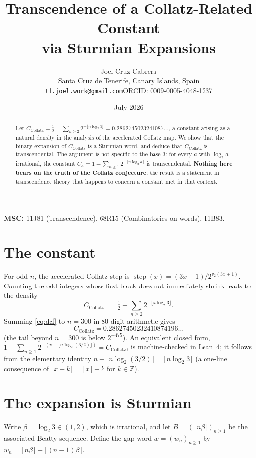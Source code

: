 \documentclass[11pt,a4paper]{article}
\title{\bfseries Transcendence of a Collatz-Related Constant\\ via Sturmian Expansions}
\author{Joel Cruz Cabrera\\
\small Santa Cruz de Tenerife, Canary Islands, Spain\\
\small\texttt{tf.joel.work@gmail.com}\quad ORCID: 0009-0005-4048-1237}
\date{July 2026}
\theoremstyle{plain}
\theoremstyle{definition}
\newcommand{\CC}{C_{\mathrm{Collatz}}}
\begin{document}
\maketitle

\begin{abstract}
Let $\CC=\tfrac12-\sum_{n\ge2}2^{-\lfloor n\log_2 3\rfloor}=0.2862745023241087\ldots$, a
constant arising as a natural density in the analysis of the accelerated Collatz map. We show
that the binary expansion of $\CC$ is a Sturmian word, and deduce that $\CC$ is
transcendental. The argument is not specific to the base $3$: for every $a$ with $\log_2 a$
irrational, the constant $C_a=1-\sum_{n\ge1}2^{-\lfloor n\log_2 a\rfloor}$ is transcendental.
\textbf{Nothing here bears on the truth of the Collatz conjecture}; the result is a statement
in transcendence theory that happens to concern a constant met in that context.
\end{abstract}

\noindent\textbf{MSC:} 11J81 (Transcendence), 68R15 (Combinatorics on words), 11B83.

\section{The constant}
For odd $n$, the accelerated Collatz step is $\operatorname{step}(x)=(3x+1)/2^{v_2(3x+1)}$.
Counting the odd integers whose first block does not immediately shrink leads to the density
\begin{equation}\label{eq:def}
  \CC \;=\; \tfrac12-\sum_{n\ge2}2^{-\lfloor n\log_2 3\rfloor}.
\end{equation}
Summing \eqref{eq:def} to $n=300$ in $80$-digit arithmetic gives
\[
  \CC=0.28627450232410874196\ldots
\]
(the tail beyond $n=300$ is below $2^{-475}$). An equivalent closed form,
$1-\sum_{n\ge1}2^{-(n+\lfloor n\log_2(3/2)\rfloor)}=\CC$, is machine-checked in Lean~4; it
follows from the elementary identity $n+\lfloor n\log_2(3/2)\rfloor=\lfloor n\log_2 3\rfloor$
(a one-line consequence of $\lfloor x-k\rfloor=\lfloor x\rfloor-k$ for $k\in\mathbb{Z}$).

\section{The expansion is Sturmian}
Write $\beta=\log_2 3\in(1,2)$, which is irrational, and let
$B=(\lfloor n\beta\rfloor)_{n\ge1}$ be the associated Beatty sequence. Define the gap word
$w=(w_n)_{n\ge1}$ by $w_n=\lfloor n\beta\rfloor-\lfloor (n-1)\beta\rfloor$.
\end{document}
